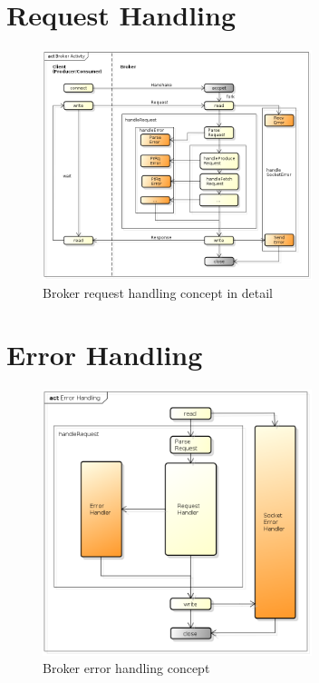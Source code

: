 \section{Request Handling}

\begin{figure}[H]
    \centering
    \includegraphics[width=0.7\textwidth]{images/broker-activity-detail.png}
    \caption{Broker request handling concept in detail}
    \label{fig:broker-activity-detail.png}
\end{figure}


\section{Error Handling}

\begin{figure}[H]
    \centering
    \includegraphics[width=0.7\textwidth]{images/broker-error-activity.png}
    \caption{Broker error handling concept}
    \label{fig:broker-error-activity.png}
\end{figure}


